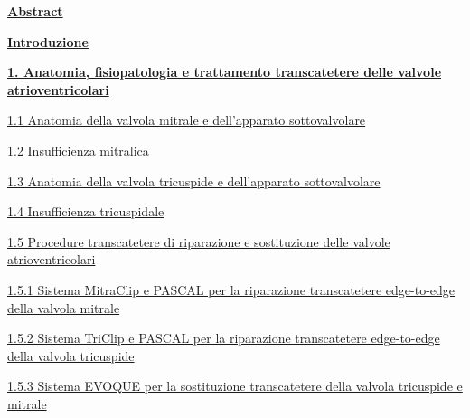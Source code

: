 \documentclass[12pt,a4paper,twoside]{article}
\begin{document}
\protect\hyperlink{abstract}{\textbf{Abstract}}\dotfill\pageref{abstract}

\protect\hyperlink{introduzione}{\textbf{Introduzione}}\dotfill\pageref{introduzione}

\protect\hyperlink{anatomia-fisiopatologia-e-trattamento-transcatetere-delle-valvole-atrioventricolari}{\textbf{1. Anatomia, fisiopatologia e trattamento transcatetere delle valvole atrioventricolari}}\dotfill\pageref{anatomia-fisiopatologia-e-trattamento-transcatetere-delle-valvole-atrioventricolari}

\begingroup\leftskip=1cm\relax
\protect\hyperlink{anatomia-della-valvola-mitrale-e-dellapparato-sottovalvolare}{1.1 Anatomia della valvola mitrale e dell'apparato sottovalvolare}\dotfill\pageref{anatomia-della-valvola-mitrale-e-dellapparato-sottovalvolare}

\protect\hyperlink{insufficienza-mitralica}{1.2 Insufficienza mitralica}\dotfill\pageref{insufficienza-mitralica}

\protect\hyperlink{anatomia-della-valvola-tricuspide-e-dellapparato-sottovalvolare}{1.3 Anatomia della valvola tricuspide e dell'apparato sottovalvolare}\dotfill\pageref{anatomia-della-valvola-tricuspide-e-dellapparato-sottovalvolare}

\protect\hyperlink{insufficienza-tricuspidale}{1.4 Insufficienza tricuspidale}\dotfill\pageref{insufficienza-tricuspidale}

\protect\hyperlink{procedure-transcatetere-di-riparazione-e-sostituzione-delle-valvole-atrioventricolari}{1.5 Procedure transcatetere di riparazione e sostituzione delle valvole atrioventricolari}\dotfill\pageref{procedure-transcatetere-di-riparazione-e-sostituzione-delle-valvole-atrioventricolari}

\protect\hyperlink{sistema-mitraclip-e-pascal-per-la-riparazione-transcatetere-edge-to-edge-della-valvola-mitrale}{1.5.1 Sistema MitraClip e PASCAL per la riparazione transcatetere edge-to-edge della valvola mitrale}\dotfill\pageref{sistema-mitraclip-e-pascal-per-la-riparazione-transcatetere-edge-to-edge-della-valvola-mitrale}

\protect\hyperlink{sistema-triclip-e-pascal-per-la-riparazione-transcatetere-edge-to-edge-della-valvola-tricuspide}{1.5.2 Sistema TriClip e PASCAL per la riparazione transcatetere edge-to-edge della valvola tricuspide}\dotfill\pageref{sistema-triclip-e-pascal-per-la-riparazione-transcatetere-edge-to-edge-della-valvola-tricuspide}

\protect\hyperlink{sistema-evoque-per-la-sostituzione-transcatetere-della-valvola-tricuspide-e-mitrale}{1.5.3 Sistema EVOQUE per la sostituzione transcatetere della valvola tricuspide e mitrale}\dotfill\pageref{sistema-evoque-per-la-sostituzione-transcatetere-della-valvola-tricuspide-e-mitrale}
\end{document}
